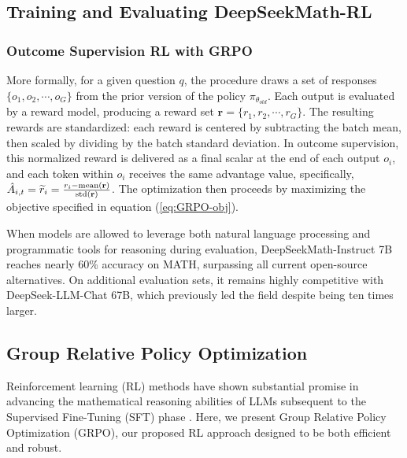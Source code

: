 {\subsection{Training and Evaluating DeepSeekMath-RL}

\subsubsection{Outcome Supervision RL with GRPO} More formally, for a given question $q$, the procedure draws a set of responses $\{o_1, o_2, \cdots, o_G\}$ from the prior version of the policy $\pi_{\theta_{old}}$. Each output is evaluated by a reward model, producing a reward set $\mathbf{r}=\{r_1, r_2, \cdots, r_G\}$. The resulting rewards are standardized: each reward is centered by subtracting the batch mean, then scaled by dividing by the batch standard deviation. In outcome supervision, this normalized reward is delivered as a final scalar at the end of each output $o_i$, and each token within $o_i$ receives the same advantage value, specifically, $\hat{A}_{i, t} = \widetilde{r}_i = \frac{r_i- {\rm mean}(\mathbf{r})}{{\rm std}(\mathbf{r})}$. The optimization then proceeds by maximizing the objective specified in equation (\ref{eq:GRPO-obj}).

When models are allowed to leverage both natural language processing and programmatic tools for reasoning during evaluation, DeepSeekMath-Instruct 7B reaches nearly 60\% accuracy on MATH, surpassing all current open-source alternatives. On additional evaluation sets, it remains highly competitive with DeepSeek-LLM-Chat 67B, which previously led the field despite being ten times larger.

\subsection{Group Relative Policy Optimization} Reinforcement learning (RL) methods have shown substantial promise in advancing the mathematical reasoning abilities of LLMs subsequent to the Supervised Fine-Tuning (SFT) phase \citep{wang2023math,wizardmath}. Here, we present Group Relative Policy Optimization (GRPO), our proposed RL approach designed to be both efficient and robust.

}
